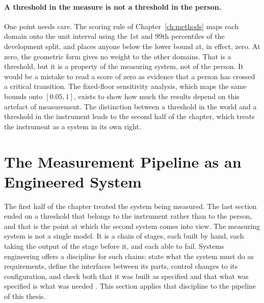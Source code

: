 \paragraph{A threshold in the measure is not a threshold in the person.} One
point needs care. The scoring rule of Chapter~\ref{ch:methods} maps each
domain onto the unit interval using the 1st and 99th percentiles of the
development split, and places anyone below the lower bound at, in effect,
zero. At zero, the geometric form gives no weight to the other domains. That
is a threshold, but it is a property of the measuring system, not of the
person. It would be a mistake to read a score of zero as evidence that a
person has crossed a critical transition. The fixed-floor sensitivity
analysis, which maps the same bounds onto $[0.05,1]$, exists to show how much
the results depend on this artefact of measurement. The distinction between
a threshold in the world and a threshold in the instrument leads to the second
half of the chapter, which treats the instrument as a system in its own right.

\section{The Measurement Pipeline as an Engineered System}
\label{sec:sys-pipeline}

The first half of the chapter treated the system being measured. The last
section ended on a threshold that belongs to the instrument rather than to the
person, and that is the point at which the second system comes into view.
The measuring system is not a single model. It is a chain of stages, each
built by hand, each taking the output of the stage before it, and each able to
fail. Systems engineering offers a discipline for such chains: state what the
system must do as requirements, define the interfaces between its parts,
control changes to its configuration, and check both that it was built as
specified and that what was specified is what was needed
\citep{incose_2015}. This section applies that discipline to the pipeline of
this thesis.

